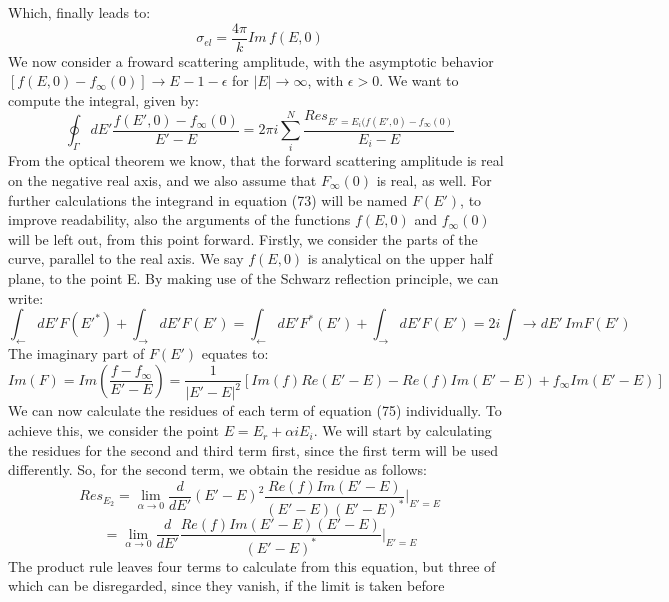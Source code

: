 \documentclass[a4paper]{article}
\begin{document}
Which, finally leads to:
\begin{equation}
    \sigma_{el}=\frac{4\pi}{k}Im\, f(E,0)
\end{equation}
We now consider a froward scattering amplitude, with the asymptotic behavior
$[f(E,0)-f_\infty(0)]\rightarrow E^{}-1-\epsilon$ for $|E|\rightarrow\infty$,
with $\epsilon>0$. We want to compute the integral, given by:
\begin{equation}
    \oint_\Gamma dE'\frac{f(E',0)-f_\infty(0)}{E'-E}=2\pi i\sum_i^N\frac{Res_{E'=E_i(f(E',0)-f_\infty(0)}}{E_i-E}
\end{equation}
From the optical theorem we know, that the forward scattering amplitude is real
on the negative real axis, and we also assume that $F_\infty(0)$ is real, as
well. For further calculations the integrand in equation (73) will be named
$F(E')$, to improve readability, also the arguments of the functions $f(E,0)$
and $f_\infty(0)$ will be left out, from this point forward. Firstly, we
consider the parts of the curve, parallel to the real axis. We say $f(E,0)$ is
analytical on the upper half plane, to the point E. By making use of the
Schwarz reflection principle, we can write:
\begin{equation}
    \int_\leftarrow dE'F(E'^*)+\int_\rightarrow dE'F(E')=\int_\leftarrow
    dE'F^*(E')+\int_\rightarrow dE'F(E')=2i\int\rightarrow dE'\, ImF(E')
\end{equation}
The imaginary part of $F(E')$ equates to:
\begin{equation}
    Im(F)=Im(\frac{f-f_\infty}{E'-E})=\frac{1}{|E'-E|^2}[Im(f)Re(E'-E)-Re(f)Im(E'-E)+f_\infty
    Im(E'-E)]
\end{equation}
We can now calculate the residues of each term of equation (75) individually.
To achieve this, we consider the point $E=E_r+\alpha iE_i$. We will start by
calculating the residues for the second and third term first, since the first
term will be used differently. So, for the second term, we obtain the residue
as follows:
\begin{equation}
    Res_{E_2}=\lim\limits_{\alpha\rightarrow
    0}\frac{d}{dE'}(E'-E)^2\frac{Re(f)Im(E'-E)}{(E'-E)(E'-E)^*}|_{E'=E}
\end{equation}
\begin{equation}
    =\lim\limits_{\alpha\rightarrow
    0}\frac{d}{dE'}\frac{Re(f)Im(E'-E)(E'-E)}{(E'-E)^*}|_{E'=E}
\end{equation}
The product rule leaves four terms to calculate from this equation, but three
of which can be disregarded, since they vanish, if the limit is taken before
\end{document}
